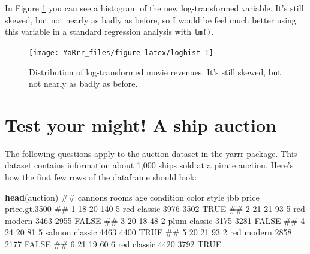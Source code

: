 \documentclass[]{book}
\newenvironment{Shaded}{\begin{snugshade}}{\end{snugshade}}
\newcommand{\KeywordTok}[1]{\textcolor[rgb]{0.13,0.29,0.53}{\textbf{#1}}}
\newcommand{\DataTypeTok}[1]{\textcolor[rgb]{0.13,0.29,0.53}{#1}}
\newcommand{\StringTok}[1]{\textcolor[rgb]{0.31,0.60,0.02}{#1}}
\newcommand{\CommentTok}[1]{\textcolor[rgb]{0.56,0.35,0.01}{\textit{#1}}}
\newcommand{\OperatorTok}[1]{\textcolor[rgb]{0.81,0.36,0.00}{\textbf{#1}}}
\newcommand{\NormalTok}[1]{#1}
\theoremstyle{definition}
\theoremstyle{definition}
\theoremstyle{remark}
\begin{document}
In Figure \ref{fig:loghist} you can see a histogram of the new
log-transformed variable. It's still skewed, but not nearly as badly as
before, so I would be feel much better using this variable in a standard
regression analysis with \texttt{lm()}.

\begin{Shaded}
\end{Shaded}

\begin{figure}

{\centering \texttt{[image: YaRrr\_files/figure-latex/loghist-1]} 

}

\caption{Distribution of log-transformed movie revenues. It's still skewed, but not nearly as badly as before.}\label{fig:loghist}
\end{figure}

\section{Test your might! A ship
auction}\label{test-your-might-a-ship-auction}

The following questions apply to the auction dataset in the yarrr
package. This dataset contains information about 1,000 ships sold at a
pirate auction. Here's how the first few rows of the dataframe should
look:

\begin{Shaded}
\begin{Highlighting}[]
\KeywordTok{head}\NormalTok{(auction)}
\NormalTok{##   cannons rooms age condition  color   style  jbb price price.gt.3500}
\NormalTok{## 1      18    20 140         5    red classic 3976  3502          TRUE}
\NormalTok{## 2      21    21  93         5    red  modern 3463  2955         FALSE}
\NormalTok{## 3      20    18  48         2   plum classic 3175  3281         FALSE}
\NormalTok{## 4      24    20  81         5 salmon classic 4463  4400          TRUE}
\NormalTok{## 5      20    21  93         2    red  modern 2858  2177         FALSE}
\NormalTok{## 6      21    19  60         6    red classic 4420  3792          TRUE}
\end{Highlighting}
\end{Shaded}
\end{document}
